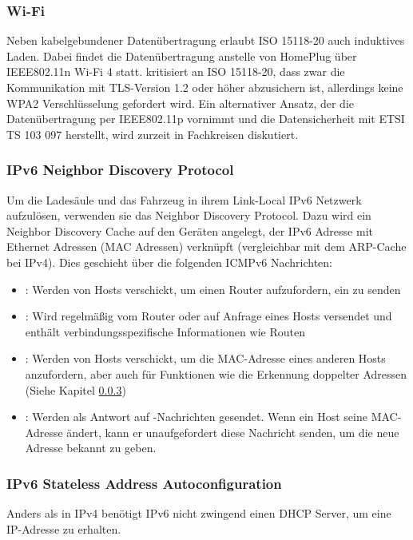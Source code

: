 \subsubsection{Wi-Fi}\label{subsec:wifi}

Neben kabelgebundener Datenübertragung erlaubt ISO 15118-20 auch induktives Laden. Dabei findet die Datenübertragung anstelle von HomePlug über IEEE802.11n Wi-Fi 4 statt. \cite{ladepause} kritisiert an ISO 15118-20, dass zwar die Kommunikation mit TLS-Version 1.2 oder höher abzusichern ist, allerdings keine WPA2 Verschlüsselung gefordert wird. Ein alternativer Ansatz, der die Datenübertragung per IEEE802.11p vornimmt und die Datensicherheit mit ETSI TS 103 097 herstellt, wird zurzeit in Fachkreisen diskutiert.

\subsubsection{IPv6 Neighbor Discovery Protocol}\label{subsec:ipv6ndp}

Um die Ladesäule und das Fahrzeug in ihrem Link-Local IPv6 Netzwerk aufzulösen, verwenden sie das Neighbor Discovery Protocol. Dazu wird ein Neighbor Discovery Cache auf den Geräten angelegt, der IPv6 Adresse mit Ethernet Adressen (MAC Adressen) verknüpft (vergleichbar mit dem ARP-Cache bei IPv4). Dies geschieht über die folgenden ICMPv6 Nachrichten:

\begin{itemize}
\item {}: Werden von Hosts verschickt, um einen Router aufzufordern, ein  zu senden
\item {}: Wird regelmäßig vom Router oder auf Anfrage eines Hosts versendet und enthält verbindungsspezifische Informationen wie Routen
\item {}: Werden von Hosts verschickt, um die MAC-Adresse eines anderen Hosts anzufordern, aber auch für Funktionen wie die Erkennung doppelter Adressen (Siehe Kapitel \ref{subsec:slaac})
\item {}: Werden als Antwort auf -Nachrichten gesendet. Wenn ein Host seine MAC-Adresse ändert, kann er unaufgefordert diese Nachricht senden, um die neue Adresse bekannt zu geben.
\end{itemize}

\cite[S. 499]{ipnetze}

\subsubsection{IPv6 Stateless Address Autoconfiguration}\label{subsec:slaac}
Anders als in IPv4 benötigt IPv6 nicht zwingend einen DHCP Server, um eine IP-Adresse zu erhalten. 

